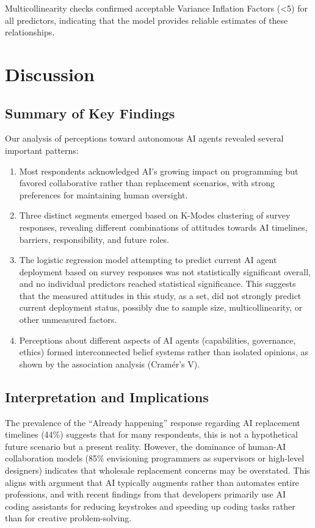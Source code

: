 \documentclass{article}
\begin{document}
Multicollinearity checks confirmed acceptable Variance Inflation Factors
(\textless5) for all predictors, indicating that the model provides
reliable estimates of these relationships.


\section{Discussion}\label{discussion}

\subsection{Summary of Key Findings}\label{summary-of-key-findings}

Our analysis of perceptions toward autonomous AI agents revealed several
important patterns:

\begin{enumerate}
	\def\labelenumi{\arabic{enumi}.}
	\item
	      Most respondents acknowledged AI's growing impact on programming but
	      favored collaborative rather than replacement scenarios, with strong
	      preferences for maintaining human oversight.
	\item
	      Three distinct segments emerged based on K-Modes clustering of survey responses, revealing different combinations of attitudes towards AI timelines, barriers, responsibility, and future roles.
	\item
	      The logistic regression model attempting to predict current AI agent deployment based on survey responses was not statistically significant overall, and no individual predictors reached statistical significance. This suggests that the measured attitudes in this study, as a set, did not strongly predict current deployment status, possibly due to sample size, multicollinearity, or other unmeasured factors.
	\item
	      Perceptions about different aspects of AI agents (capabilities,
	      governance, ethics) formed interconnected belief systems rather than
	      isolated opinions, as shown by the association analysis (Cramér's V).
\end{enumerate}

\subsection{Interpretation and
	Implications}\label{interpretation-and-implications}

The prevalence of the ``Already happening'' response regarding AI
replacement timelines (44\%) suggests that for many respondents, this is
not a hypothetical future scenario but a present reality. However, the
dominance of human-AI collaboration models (85\% envisioning programmers
as supervisors or high-level designers) indicates that wholesale
replacement concerns may be overstated. This aligns with \cite{DavenportKirby2016} argument that AI typically augments rather than automates
entire professions, and with recent findings from \cite{ICSESurvey2024} that
developers primarily use AI coding assistants for reducing keystrokes
and speeding up coding tasks rather than for creative problem-solving.
\end{document}

